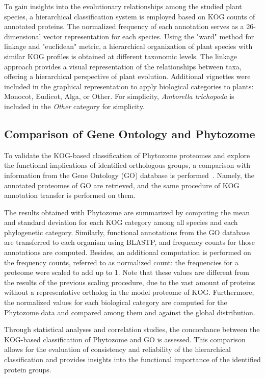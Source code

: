 To gain insights into the evolutionary relationships among 
the studied plant species, a hierarchical classification 
system is employed based on KOG counts of annotated proteins. 
The normalized frequency of each annotation serves as a 
26-dimensional vector representation for each species. Using the 
"ward" method for linkage and "euclidean" metric, a hierarchical 
organization of plant species with similar KOG profiles is 
obtained at different taxonomic levels. The linkage approach 
provides a visual representation 
of the relationships between taxa, offering a hierarchical 
perspective of plant evolution. Additional vignettes were 
included in the graphical representation to apply biological 
categories to plants: Monocot, Eudicot, Alga, or Other. 
For simplicity, \emph{Amborella trichopoda} is included in 
the \emph{Other} category for simplicity.


\subsection{Comparison of Gene Ontology and Phytozome}
\label{sec:method.compare}

To validate the KOG-based classification of Phytozome proteomes 
and explore the functional implications of identified 
orthologous groups, a 
comparison with information from the Gene Ontology (GO) 
database is performed~\citep{ashburner2000,consortium2023}.
Namely, the annotated proteomes of GO are retrieved, and the 
same procedure of KOG annotation transfer is performed on them.

The results obtained with Phytozome are summarized by 
computing the mean and standard deviation for each KOG 
category among all species and each phylogenetic category. 
Similarly, functional annotations from the GO database are 
transferred to each organism using BLASTP, and frequency 
counts for those annotations are computed. Besides, an 
additional computation is performed on the frequency counts, 
referred to as normalized count: the frequencies 
for a proteome were scaled to add up to 1. Note that these 
values are different from the results of the previous 
scaling procedure, due to the vast amount of proteins 
without a representative ortholog in the model proteome 
of KOG. Furthermore, the normalized values for each 
biological category are computed for the Phytozome data and
compared among them and against the global distribution.

Through statistical analyses and correlation studies, the 
concordance between the KOG-based classification of Phytozome 
and GO is assessed. This comparison allows for the 
evaluation of consistency and reliability of the 
hierarchical classification and provides insights into the 
functional importance of the identified protein groups.
